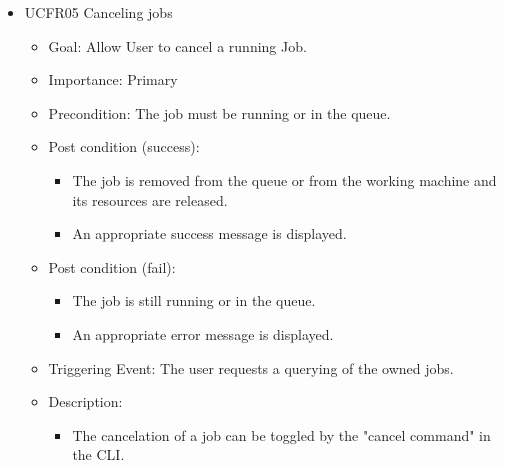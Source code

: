 \begin{itemize}
	\item UCFR05 Canceling jobs
	\begin{itemize}
		\item Goal: Allow User to cancel a running Job.
		\item Importance: Primary
		\item Precondition: The job must be running or in the queue.
		\item Post condition (success):
		\begin{itemize}
		  \item The job is removed from the queue or from the working machine and its resources are released.
		  \item An appropriate success message is displayed.
	    \end{itemize}  
		\item Post condition (fail):
		\begin{itemize}
			\item The job is still running or in the queue.
			\item An appropriate error message is displayed.
		\end{itemize}
		\item Triggering Event: The user requests a querying of the owned jobs.
		\item Description:
		\begin{itemize}
			\item   The cancelation of a job can be toggled by the "cancel command" in the CLI.
		\end{itemize}
	\end{itemize}
	

\end{itemize}
